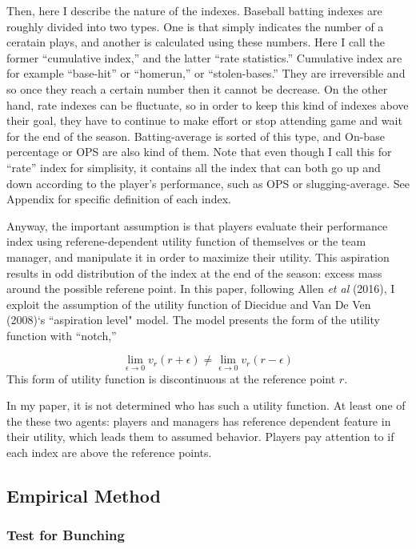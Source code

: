 \documentclass[dvipdfmx, 12pt]{article}
\begin{document}
Then, here I describe the nature of the indexes. Baseball batting indexes are roughly divided into two types. One is that simply indicates the number of a ceratain plays, and another is calculated using these numbers. Here I call the former ``cumulative index,'' and the latter ``rate statistics.'' Cumulative index are for example ``base-hit'' or ``homerun,'' or ``stolen-bases.'' They are irreversible and so once they reach a certain number then it cannot be decrease. On the other hand, rate indexes can be fluctuate, so in order to keep this kind of indexes above their goal, they have to continue to make effort or stop attending game and wait for the end of the season. Batting-average is sorted of this type, and On-base percentage or OPS are also kind of them. Note that even though I call this for ``rate'' index for simplisity, it contains all the index that can both go up and down according to the player's performance, such as OPS or slugging-average. See Appendix for specific definition of each index.

Anyway, the important assumption is that players evaluate their performance index using referene-dependent utility function of themselves or the team manager, and manipulate it in order to maximize their utility. This aspiration results in odd distribution of the index at the end of the season: excess mass around the possible referene point. In this paper, following Allen \textit{et al} (2016), I exploit the assumption of the utility function of Diecidue and Van De Ven (2008)`s ``aspiration level" model. The model presents the form of the utility function with ``notch,''

\[
\lim_{\epsilon \to 0} v_r (r + \epsilon) \neq
\lim_{\epsilon \to 0} v_r (r - \epsilon)
\]
This form of utility function is discontinuous at the reference point $r$.

In my paper, it is not determined who has such a utility function. At least one of the these two agents: players and managers has reference dependent feature in their utility, which leads them to assumed behavior. Players pay attention to if each index are above the reference points.



 \subsection{Empirical Method}

  \subsubsection{Test for Bunching}
\end{document}
